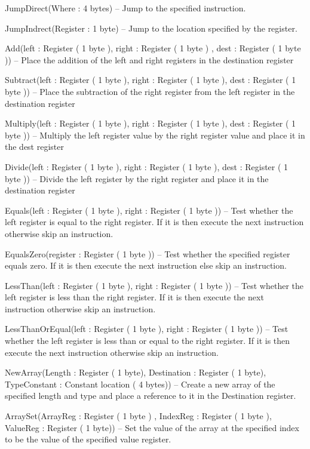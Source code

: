 \documentclass[]{final_report}
\begin{document}
JumpDirect(Where : 4 bytes) – Jump to the specified instruction.

JumpIndrect(Register : 1 byte) – Jump to the location specified by the register.

Add(left : Register ( 1 byte ), right : Register ( 1 byte ) , dest : Register ( 1 byte )) – Place the
addition of the left and right registers in the destination register

Subtract(left : Register ( 1 byte ), right : Register ( 1 byte ), dest : Register ( 1 byte )) – Place the
subtraction of the right register from the left register in the destination register

Multiply(left : Register ( 1 byte ), right : Register ( 1 byte ), dest : Register ( 1 byte )) – Multiply
the left register value by the right register value and place it in the dest register

Divide(left : Register ( 1 byte ), right : Register ( 1 byte ), dest : Register ( 1 byte )) – Divide the
left register by the right register and place it in the destination register

Equals(left : Register ( 1 byte ), right : Register ( 1 byte )) – Test whether the left register is equal
to the right register. If it is then execute the next instruction otherwise skip an instruction.

EqualsZero(register : Register ( 1 byte )) – Test whether the specified register equals zero. If it is
then execute the next instruction else skip an instruction.

LessThan(left : Register ( 1 byte ), right : Register ( 1 byte )) – Test whether the left register is less
than the right register. If it is then execute the next instruction otherwise skip an instruction.

LessThanOrEqual(left : Register ( 1 byte ), right : Register ( 1 byte )) – Test whether the left
register is less than or equal to the right register. If it is then execute the next instruction otherwise
skip an instruction.

NewArray(Length : Register ( 1 byte), Destination : Register ( 1 byte), TypeConstant : Constant
location ( 4 bytes)) – Create a new array of the specified length and type and place a reference to it
in the Destination register.

ArraySet(ArrayReg : Register ( 1 byte ) , IndexReg : Register ( 1 byte ), ValueReg : Register ( 1
byte)) – Set the value of the array at the specified index to be the value of the specified value
register.
\end{document}
